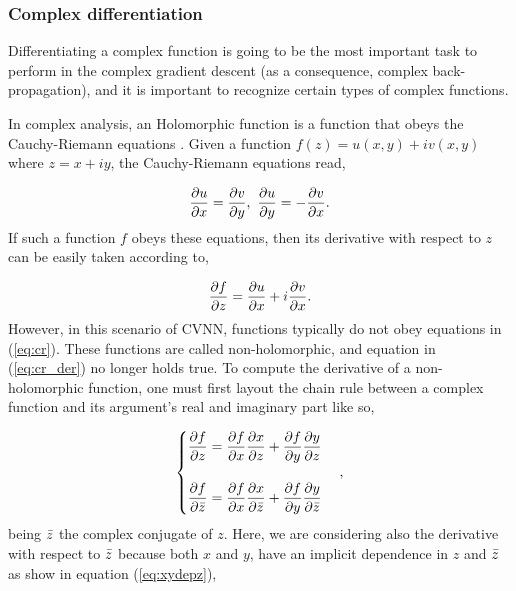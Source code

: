 \subsubsection{Complex differentiation}
Differentiating a complex function is going to be the most important task to perform in the complex gradient descent (as a consequence, complex back-propagation), and it is important to recognize certain types of complex functions.

In complex analysis, an Holomorphic function is a function that obeys the Cauchy-Riemann equations \parencite{Cauchy1814}. Given a function $ f(z) = u(x,y) + iv(x,y) $ where $ z = x + iy $, the Cauchy-Riemann equations read,

\begin{equation}
	\dfrac{\partial u}{\partial x} = \dfrac{\partial v}{\partial y}, \ \dfrac{\partial u}{\partial y} = -\dfrac{\partial v}{\partial x}.
	\label{eq:cr}
\end{equation}
If such a function $ f $ obeys these equations, then its derivative with respect to $ z $ can be easily taken according to,

\begin{equation}
	\dfrac{\partial f}{\partial z} = \dfrac{\partial u}{\partial x} + i\dfrac{\partial v}{\partial x}.
	\label{eq:cr_der}
\end{equation}
However, in this scenario of \gls{CVNN}, functions typically do not obey equations in (\ref{eq:cr}). These functions are called non-holomorphic, and equation in (\ref{eq:cr_der}) no longer holds true. To compute the derivative of a non-holomorphic function, one must first layout the chain rule between a complex function and its argument's real and imaginary part like so,

\begin{equation}
	\begin{cases}
		\dfrac{\partial f}{\partial z} = \dfrac{\partial f}{\partial x}\dfrac{\partial x}{\partial z} + \dfrac{\partial f}{\partial y}\dfrac{\partial y}{\partial z} \\
		\\
		\dfrac{\partial f}{\partial \bar{z}} = \dfrac{\partial f}{\partial x}\dfrac{\partial x}{\partial \bar{z}} + \dfrac{\partial f}{\partial y}\dfrac{\partial y}{\partial \bar{z}}
	\end{cases},
	\label{eq:complex_chain_der}
\end{equation}
being $ \bar{z} $ the complex conjugate of $ z $. Here, we are considering also the derivative with respect to $ \bar{z} $ because both $ x $ and $ y $, have an implicit dependence in $ z $ and $ \bar{z} $ as show in equation (\ref{eq:xydepz}),

